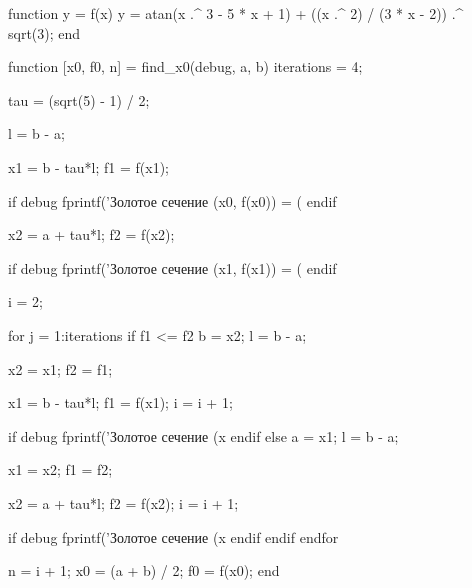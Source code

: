 function y = f(x)
  y = atan(x .^ 3 - 5 * x + 1) + ((x .^ 2) / (3 * x - 2)) .^ sqrt(3);
end

function [x0, f0, n] = find_x0(debug, a, b)
  iterations = 4;

  tau = (sqrt(5) - 1) / 2;

  l = b - a;

  x1 = b - tau*l;
  f1 = f(x1);

  if debug
    fprintf('Золотое сечение (x0, f(x0)) = (%
  endif

  x2 = a + tau*l;
  f2 = f(x2);

  if debug
    fprintf('Золотое сечение (x1, f(x1)) = (%
  endif

  i = 2;

  for j = 1:iterations
    if f1 <= f2
      b = x2;
      l = b - a;

      x2 = x1;
      f2 = f1;

      x1 = b - tau*l;
      f1 = f(x1);
      i = i + 1;

      if debug
        fprintf('Золотое сечение (x%
      endif
    else
      a = x1;
      l = b - a;

      x1 = x2;
      f1 = f2;

      x2 = a + tau*l;
      f2 = f(x2);
      i = i + 1;

      if debug
        fprintf('Золотое сечение (x%
      endif
    endif
  endfor

  n = i + 1;
  x0 = (a + b) / 2;
  f0 = f(x0);
end